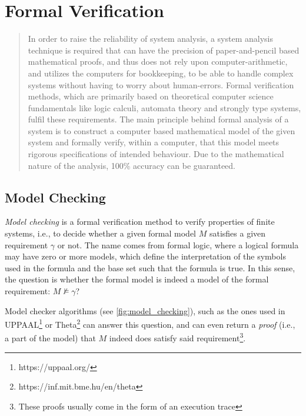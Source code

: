 \section{Formal Verification}\label{sec:formal_verification}

\blockcquote{https://doi:10.4018/978-1-4666-5888-2.ch705}{
	In order to raise the reliability of system analysis, a system analysis technique is required that can have the precision of paper-and-pencil based mathematical proofs, and thus does not rely upon computer-arithmetic, and utilizes the computers for bookkeeping, to be able to handle complex systems without having to worry about human-errors. Formal verification methods, which are primarily based on theoretical computer science fundamentals like logic calculi, automata theory and strongly type systems, fulfil these requirements. The main principle behind formal analysis of a system is to construct a computer based mathematical model of the given system and formally verify, within a computer, that this model meets rigorous specifications of intended behaviour. Due to the mathematical nature of the analysis, 100\% accuracy can be guaranteed.
}

\subsection{Model Checking}

\emph{Model checking} is a formal verification method to verify properties of finite systems, i.e., to decide whether a given formal model \(M\) satisfies a given requirement \(\gamma\) or not. The name comes from formal logic, where a logical formula may have zero or more models, which define the interpretation of the symbols used in the formula and the base set such that the formula is true. In this sense, the question is whether the formal model is indeed a model of the formal requirement: \(M \not\models \gamma\)?

Model checker algorithms (see \autoref{fig:model_checking}), such as the ones used in UPPAAL\footnote{https://uppaal.org/} \cite{uppaal} or Theta\footnote{https://inf.mit.bme.hu/en/theta} \cite{theta} can answer this question, and can even return a \emph{proof} (i.e., a part of the model) that \(M\) indeed does satisfy said requirement\footnote{These proofs usually come in the form of an execution trace}.

